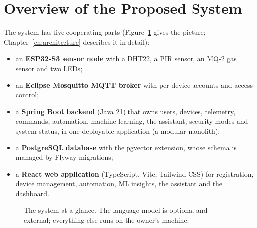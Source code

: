 \documentclass[12pt,a4paper,oneside]{report}
\begin{document}
\section{Overview of the Proposed System}
The system has five cooperating parts (Figure~\ref{fig:overview-simple} gives the picture; Chapter~\ref{ch:architecture} describes it in detail):
\begin{itemize}
  \item an \textbf{ESP32-S3 sensor node} with a DHT22, a PIR sensor, an MQ-2 gas sensor and two LEDs;
  \item an \textbf{Eclipse Mosquitto MQTT broker} with per-device accounts and access control;
  \item a \textbf{Spring Boot backend} (Java 21) that owns users, devices, telemetry, commands, automation, machine learning, the assistant, security modes and system status, in one deployable application (a modular monolith);
  \item a \textbf{PostgreSQL database} with the pgvector extension, whose schema is managed by Flyway migrations;
  \item a \textbf{React web application} (TypeScript, Vite, Tailwind CSS) for registration, device management, automation, ML insights, the assistant and the dashboard.
\end{itemize}

\begin{figure}[H]
\centering
{}
\caption{The system at a glance. The language model is optional and external; everything else runs on the owner's machine.}
\label{fig:overview-simple}
\end{figure}
\end{document}
